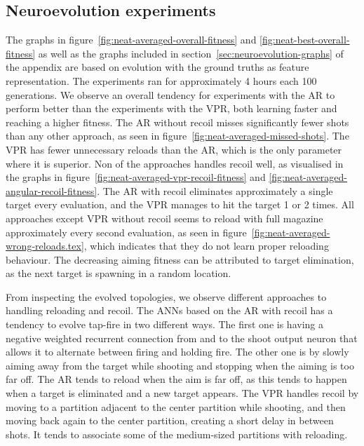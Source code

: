 \subsection{Neuroevolution experiments}
\label{sec:neuroevolution-experiments-results}
The graphs in figure~\ref{fig:neat-averaged-overall-fitness} and \ref{fig:neat-best-overall-fitness} as well as the graphs included in section~\ref{sec:neuroevolution-graphs} of the appendix are based on evolution with the ground truths as feature representation. The experiments ran for approximately 4 hours each 100 generations. We observe an overall tendency for experiments with the AR to perform better than the experiments with the VPR, both learning faster and reaching a higher fitness. The AR without recoil misses significantly fewer shots than any other approach, as seen in figure~\ref{fig:neat-averaged-missed-shots}. The VPR has fewer unnecessary reloads than the AR, which is the only parameter where it is superior. Non of the approaches  handles recoil well, as visualised in the graphs in figure~\ref{fig:neat-averaged-vpr-recoil-fitness} and \ref{fig:neat-averaged-angular-recoil-fitness}. The AR with recoil eliminates approximately a single target every evaluation, and the VPR manages to hit the target 1 or 2 times. All approaches except VPR without recoil seems to reload with full magazine approximately every second evaluation, as seen in figure~\ref{fig:neat-averaged-wrong-reloads.tex}, which indicates that they do not learn proper reloading behaviour. The decreasing aiming fitness can be attributed to target elimination, as the next target is spawning in a random location.

From inspecting the evolved topologies, we observe different approaches to handling reloading and recoil. The ANNs based on the AR with recoil has a tendency to evolve tap-fire in two different ways. The first one is having a negative weighted recurrent connection from and to the shoot output neuron that allows it to alternate between firing and holding fire. The other one is by slowly aiming away from the target while shooting and stopping when the aiming is too far off. The AR tends to reload when the aim is far off, as this tends to happen when a target is eliminated and a new target appears. The VPR handles recoil by moving to a partition adjacent to the center partition while shooting, and then moving back again to the center partition, creating a short delay in between shots. It tends to associate some of the medium-sized partitions with reloading.

